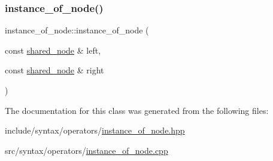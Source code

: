 \subsubsection{\texorpdfstring{instance\+\_\+of\+\_\+node()}{instance\_of\_node()}}
{\footnotesize\ttfamily instance\+\_\+of\+\_\+node\+::instance\+\_\+of\+\_\+node (\begin{DoxyParamCaption}\item[{const \hyperlink{namespacejawe_a3f307481d921b6cbb50cc8511fc2b544}{shared\+\_\+node} \&}]{left,  }\item[{const \hyperlink{namespacejawe_a3f307481d921b6cbb50cc8511fc2b544}{shared\+\_\+node} \&}]{right }\end{DoxyParamCaption})}



The documentation for this class was generated from the following files\+:\begin{DoxyCompactItemize}
\item 
include/syntax/operators/\hyperlink{instance__of__node_8hpp}{instance\+\_\+of\+\_\+node.\+hpp}\item 
src/syntax/operators/\hyperlink{instance__of__node_8cpp}{instance\+\_\+of\+\_\+node.\+cpp}\end{DoxyCompactItemize}
